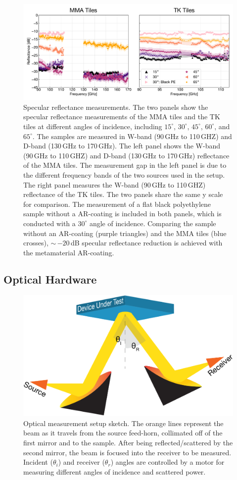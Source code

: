 \begin{figure}[t]
    \centering
    \includegraphics[width = \textwidth]{Figures/refl_2.2020.pdf}
    \caption{Specular reflectance measurements. The two panels show the specular reflectance measurements of the MMA tiles and the TK tiles at different angles of incidence, including $15^{\circ}$, $30^{\circ}$, $45^{\circ}$, $60^{\circ}$, and $65^{\circ}$. The samples are measured in W-band (90\,GHz to 110\,GHZ) and D-band (130\,GHz to 170\,GHz). The left panel shows the W-band (90\,GHz to 110\,GHZ) and D-band (130\,GHz to 170\,GHz) reflectance of the MMA tiles. The measurement gap in the left panel is due to the different frequency bands of the two sources used in the setup. The right panel measures the W-band (90\,GHz to 110\,GHZ) reflectance of the TK tiles. The two panels share the same y scale for comparison. The measurement of a flat black polyethylene sample without a AR-coating is included in both panels, which is conducted with a $30^{\circ}$ angle of incidence. Comparing the sample without an AR-coating (purple triangles) and the MMA tiles (blue crosses), $\sim$\,$-20$\,dB specular reflectance reduction is achieved with the metamaterial AR-coating.}
    \label{fig:reflection_result}
\end{figure}


\subsection{Optical Hardware}
\begin{figure}
    \centering
    \includegraphics[width = .7\textwidth]{Figures/refl_setup.pdf}
    \caption{Optical measurement setup sketch. The orange lines represent the beam as it travels from the source feed-horn, collimated off of the first mirror and to the sample. After being reflected/scattered by the second mirror, the beam is focused into the receiver to be measured. Incident ($\theta_i$) and receiver ($\theta_r$) angles are controlled by a motor for measuring different angles of incidence and scattered power.}
    \label{fig:optical_setup}
\end{figure}

